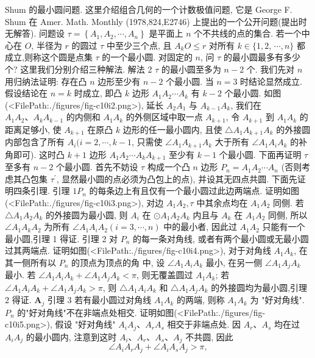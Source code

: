 Shum 的最小圆问题.
这里介绍组合几何的一个计数极值问题, 它是 George F. Shum 在 Amer. Math. Monthly (1978,824,E2746) 上提出的一个公开问题(提出时无解答).
问题设 $\tau=\left\{A_1, A_2, \cdots, A_n\right\}$ 是平面上 $n$ 个不共线的点的集合.
若一个中心在 $O$, 半径为 $r$ 的圆过 $\tau$ 中至少三个点, 且 $A_k O \leqslant r$ 对所有 $k \in\{1,2$, $\cdots, n\}$ 都成立,则称这个圆是点集 $\tau$ 的一个最小圆.
对固定的 $n$, 问 $\tau$ 的最小圆最多有多少个?
这里我们分别介绍三种解法.
解法 2 $\tau$ 的最小圆至多为 $n-2$ 个.
我们先对 $n$ 用归纳法证明: 存在凸 $n$ 边形至少有 $n-2$ 个最小圆.
当 $n=3$ 时结论显然成立.
假设结论在 $n=k$ 时成立, 即凸 $k$ 边形 $A_1 A_2 \cdots A_k$ 有 $k-2$ 个最小圆.
如图(<FilePath:./figures/fig-c10i2.png>), 延长 $A_2 A_1$ 与 $A_{k-1} A_k$, 我们在 $A_1 A_2 、 A_k A_{k-1}$ 的内侧和 $A_1 A_k$ 的外侧区域中取一点 $A_{k+1}$, 令 $A_{k+1}$ 到 $A_1 A_k$ 的距离足够小, 使 $A_{k+1}$ 在原凸 $k$ 边形的任一最小圆内, 且使 $\triangle A_1 A_{k+1} A_k$ 的外接圆内部包含了所有 $A_i(i=2, \cdots, k-1$, 只需使 $\angle A_1 A_{k+1} A_k$ 大于所有 $\angle A_1 A_i A_k$ 的补角即可). 这时凸
$k+1$ 边形 $A_1 A_2 \cdots A_k A_{k+1}$ 至少有 $k-1$ 个最小圆.
下面再证明 $\tau$ 至多有 $n-2$ 个最小圆.
首先不妨设 $\tau$ 构成一个凸 $n$ 边形 $P_n=A_1 A_2 \cdots A_n$ (否则考虑其凸包集 $\tau^{\prime}$, 显然最小圆的点必须为凸包上的点), 并设其无四点共圆.
下面先证明四条引理.
引理 $1 P_n$ 的每条边上有且仅有一个最小圆过此边两端点.
证明如图(<FilePath:./figures/fig-c10i3.png>), 对边 $A_1 A_2, \tau$ 中其余点均在 $A_1 A_2$ 同侧.
若 $\triangle A_1 A_2 A_k$ 的外接圆为最小圆, 则 $A_i$ 在 $\odot A_1 A_2 A_k$ 内且与 $A_k$ 在 $A_1 A_2$ 同侧, 所以 $\angle A_1 A_k A_2$ 为所有 $\angle A_1 A_i A_2(i=3, \cdots, n)$ 中的最小者, 因此过 $A_1 A_2$ 只能有一个最小圆,引理 1 得证.
引理 2 对 $P_n$ 的每一条对角线, 或者有两个最小圆或无最小圆过其两端点.
证明如图(<FilePath:./figures/fig-c10i4.png>), 对于对角线 $A_1 A_k$, 在其一侧所有以 $P_n$ 的顶点为顶点的角 中, 设 $\angle A_1 A_i A_k$ 最小, 在另一侧 $\angle A_1 A_j A_k$ 最小.
若 $\angle A_1 A_i A_k+ \angle A_1 A_j A_k<\pi$, 则无覆盖圆过 $A_1 A_k$; 若 $\angle A_1 A_i A_k+\angle A_1 A_j A_k>\pi$, 则 $\triangle A_1 A_i A_k$ 和 $\triangle A_1 A_j A_k$ 的外接圆均为最小圆,引理 2 得证.
$\boldsymbol{A}_j$
引理 3 若有最小圆过对角线 $A_1 A_k$ 的两端, 则称 $A_1 A_k$ 为 "好对角线". $P_n$ 的"好对角线"不在非端点处相交.
证明如图(<FilePath:./figures/fig-c10i5.png>), 假设 "好对角线" $A_i A_j 、 A_r A_s$ 相交于非端点处.
因 $A_r 、 A_s$ 均在过 $A_i A_j$ 的最小圆内, 注意到这时 $A_i 、 A_r 、 A_s 、 A_j$ 不共圆, 因此
$$
\angle A_i A_r A_j+\angle A_i A_s A_j>\pi,
$$
